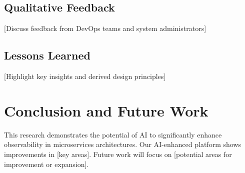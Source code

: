 \documentclass[10pt,journal,compsoc]{IEEEtran}
\begin{document}
\subsection{Qualitative Feedback}
[Discuss feedback from DevOps teams and system administrators]

\subsection{Lessons Learned}
[Highlight key insights and derived design principles]

\section{Conclusion and Future Work}
This research demonstrates the potential of AI to significantly enhance observability in microservices architectures. Our AI-enhanced platform shows improvements in [key areas]. Future work will focus on [potential areas for improvement or expansion].



\end{document}
